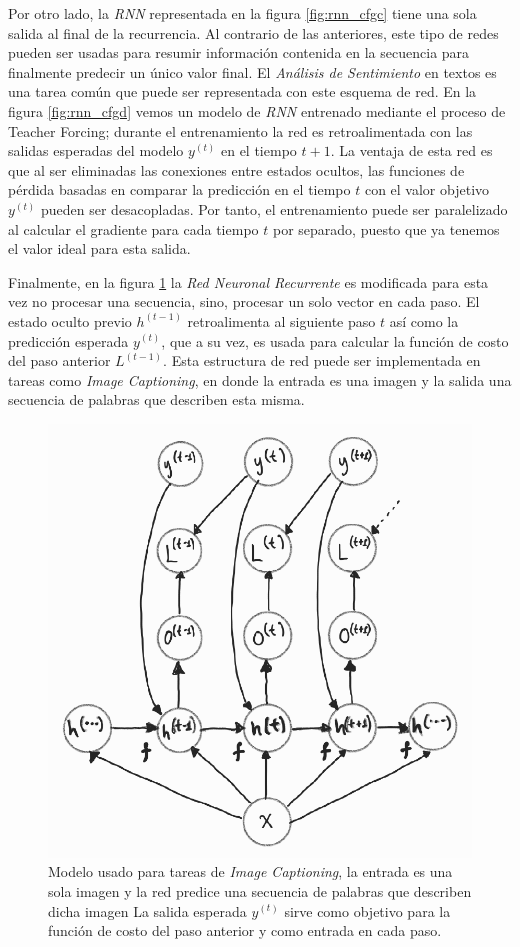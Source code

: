 Por otro lado, la \textit{RNN} representada en la figura \ref{fig:rnn_cfgc} tiene una sola salida al
final de la recurrencia.
Al contrario de las anteriores, este tipo de redes pueden ser usadas para resumir
información contenida en la secuencia para finalmente predecir un único valor final.
El \textit{Análisis de Sentimiento} en textos es una tarea común que puede ser representada con este esquema
de red. En la figura \ref{fig:rnn_cfgd} vemos un modelo de \textit{RNN} entrenado mediante el proceso de
Teacher Forcing; durante el entrenamiento la red es retroalimentada con las salidas
esperadas del modelo $y^{(t)}$ en el tiempo $t+1$. La ventaja de esta red es que al ser eliminadas
las conexiones entre estados ocultos, las funciones de pérdida basadas en comparar la predicción en
el tiempo $t$ con el valor objetivo $y^{(t)}$ pueden ser desacopladas. Por tanto, el entrenamiento
puede ser paralelizado al calcular el gradiente para cada tiempo $t$ por separado, puesto que ya
tenemos el valor ideal para esta salida.

Finalmente, en la figura \ref{fig:rnn_cfge} la \textit{Red Neuronal Recurrente} es modificada para esta vez
no procesar una secuencia, sino, procesar un solo vector en cada paso. El estado oculto
previo $h^{(t-1)}$ retroalimenta al siguiente paso $t$ así como la predicción esperada $y^{(t)}$, que
a su vez, es usada para calcular la función de costo del paso anterior $L^{(t-1)}$. Esta estructura de
red puede ser implementada en tareas como \textit{Image Captioning}, en donde la entrada es una imagen y la salida
una secuencia de palabras que describen esta misma.

\begin{figure}[!ht]
\centering
\includegraphics[width=.4\textwidth]{Chapters/2. Transformer/Figures/rnn/rnn_cfge.png}
\caption[RNN - Image Captioning]{Modelo usado para tareas de \textit{Image Captioning}, la entrada es una
sola imagen y la red predice una secuencia de palabras que describen dicha imagen La salida esperada
$y^{(t)}$ sirve como objetivo para la función de costo del paso anterior y como entrada en cada paso.}
\label{fig:rnn_cfge}
\end{figure}


